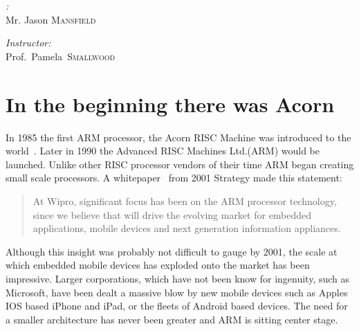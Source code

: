 \documentclass[11pt]{report}
\begin{document}
\lstset{language=[mips]Assembler}
\begin{titlepage}

\begin{center}
\textsc{{\LARGE\color{Sepia}{CS440}}}\\[1.5cm]
\textsc{{\LARGE\color{Bittersweet}{The ARM1176JZF-S Architecture}}}\\[1.5cm]

\begin{minipage}{0.4\textwidth}
\begin{flushleft} \large
\emph{\color{RedOrange}{Author}:}\\
Mr. Jason \textsc{Mansfield}
\end{flushleft}\end{minipage}
\begin{minipage}{0.4\textwidth}
\begin{flushright} \large
\emph{\color{RedOrange}Instructor:} \\
Prof.~Pamela~\textsc{Smallwood}
\end{flushright}
\end{minipage}
\end{center}
\end{titlepage}

\tableofcontents
\clearpage
\section{In the beginning there was Acorn}
\begin{onehalfspace}
In 1985 the first ARM processor, the Acorn RISC Machine was introduced to the world~\citep{levy2005history}. Later in 1990 the Advanced RISC Machines Ltd.(ARM) would be launched. Unlike other RISC processor vendors of their time ARM began creating small scale processors. A whitepaper~\citep{kamath2001system} from 2001 Strategy made this statement: 
\end{onehalfspace}
\begin{quote}
At Wipro, significant focus has been on the ARM processor technology, since we believe that will drive the evolving market for embedded applications, mobile devices and next generation information appliances.
\end{quote}
\begin{onehalfspace}
Although this insight was probably not difficult to gauge by 2001, the scale at which embedded mobile devices has exploded onto the market has been impressive. Larger corporations, which have not been know for ingenuity, such as Microsoft, have been dealt a massive blow by new mobile devices such as Apples IOS based iPhone and iPad, or the fleets of Android based devices. The need for a smaller architecture has never been greater and ARM is sitting center stage. 
\end{onehalfspace}
\end{document}
